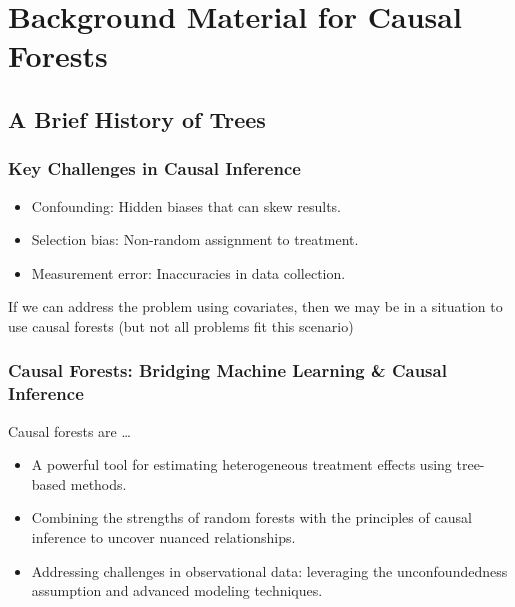 \documentclass{beamer}
\begin{document}



\section{Background Material for Causal Forests}

\subsection{A Brief History of Trees}

\begin{frame}
\frametitle{Key Challenges in Causal Inference}
\begin{itemize}
    \item Confounding: Hidden biases that can skew results.
    \item Selection bias: Non-random assignment to treatment.
    \item Measurement error: Inaccuracies in data collection.
\end{itemize}

\bigskip

If we can address the problem using covariates, then we may be in a situation to use causal forests (but not all problems fit this scenario)

\end{frame}


\begin{frame}
\frametitle{Causal Forests: Bridging Machine Learning \& Causal Inference}

Causal forests are \dots

\begin{itemize}
    \item A powerful tool for estimating heterogeneous treatment effects using tree-based methods.
    \item Combining the strengths of random forests with the principles of causal inference to uncover nuanced relationships.
    \item Addressing challenges in observational data: leveraging the unconfoundedness assumption and advanced modeling techniques.
\end{itemize}
\end{frame}
\end{document}

